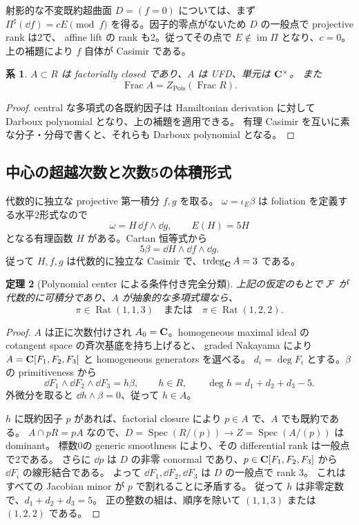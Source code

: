 \documentclass[11pt,a4paper]{ltjsarticle}
\DeclareMathOperator{\Pois}{Pois}\DeclareMathOperator{\rank}{rank}\DeclareMathOperator{\Spec}{Spec}
\DeclareMathOperator{\Frac}{Frac}\DeclareMathOperator{\Pf}{Pf}\DeclareMathOperator{\PGL}{PGL}
\DeclareMathOperator{\Rat}{Rat}\DeclareMathOperator{\Log}{Log}\DeclareMathOperator{\Aff}{Aff}
\newtheorem{theorem}{定理}[section]\newtheorem{proposition}[theorem]{命題}\newtheorem{lemma}[theorem]{補題}\newtheorem{corollary}[theorem]{系}
\theoremstyle{remark}\newtheorem{remark}[theorem]{注意}\renewcommand{\proofname}{証明}
\begin{document}
射影的な不変既約超曲面 $D=(f=0)$ については、まず
$\Pi^\sharp(\dd f)=cE\pmod f$ を得る。因子的零点がないため $D$ の一般点で projective rank は2で、
affine lift の rank も2。従ってその点で $E\notin\operatorname{im}\Pi$ となり、$c=0$。
上の補題により $f$ 自体が Casimir である。

\begin{corollary}
$A\subset R$ は factorially closed であり、$A$ は UFD、単元は $\mathbf C^\times$。
また
\[
 \Frac A=Z_{\Pois}(\Frac R).
\]
\end{corollary}
\begin{proof}
central な多項式の各既約因子は Hamiltonian derivation に対して Darboux polynomial となり、上の補題を適用できる。
有理 Casimir を互いに素な分子・分母で書くと、それらも Darboux polynomial となる。
\end{proof}

\subsection{中心の超越次数と次数5の体積形式}
代数的に独立な projective 第一積分 $f,g$ を取る。
$\omega=\iota_E\beta$ は foliation を定義する水平2形式なので
\[
 \omega=H\,\dd f\wedge\dd g,\qquad E(H)=5H
\]
となる有理函数 $H$ がある。Cartan 恒等式から
\[
 5\beta=\dd H\wedge\dd f\wedge\dd g.
\]
従って $H,f,g$ は代数的に独立な Casimir で、$\operatorname{trdeg}_\mathbf C A=3$ である。

\begin{theorem}[Polynomial center による条件付き完全分類]\label{thm:center}
上記の仮定のもとで $\mathcal F$ が代数的に可積分であり、$A$ が抽象的な多項式環なら、
\[
 \pi\in\Rat(1,1,3)\quad\text{または}\quad\pi\in\Rat(1,2,2).
\]
\end{theorem}
\begin{proof}
$A$ は正に次数付けされ $A_0=\mathbf C$。homogeneous maximal ideal の cotangent space の斉次基底を持ち上げると、
graded Nakayama により $A=\mathbf C[F_1,F_2,F_3]$ と homogeneous generators を選べる。
$d_i=\deg F_i$ とする。$\beta$ の primitiveness から
\[
 \dd F_1\wedge\dd F_2\wedge\dd F_3=h\beta,
 \qquad h\in R,\qquad \deg h=d_1+d_2+d_3-5.
\]
外微分を取ると $\dd h\wedge\beta=0$、従って $h\in A$。

$h$ に既約因子 $p$ があれば、factorial closure により $p\in A$ で、$A$ でも既約である。
$A\cap pR=pA$ なので、$D=\Spec(R/(p))\to Z=\Spec(A/(p))$ は dominant。
標数0の generic smoothness により、その differential rank は一般点で2である。
さらに $\dd p$ は $D$ の非零 conormal であり、$p\in\mathbf C[F_1,F_2,F_3]$ から $\dd F_i$ の線形結合である。
よって $\dd F_1,\dd F_2,\dd F_3$ は $D$ の一般点で rank 3。
これはすべての Jacobian minor が $p$ で割れることに矛盾する。
従って $h$ は非零定数で、$d_1+d_2+d_3=5$。
正の整数の組は、順序を除いて $(1,1,3)$ または $(1,2,2)$ である。
\end{proof}
\end{document}
